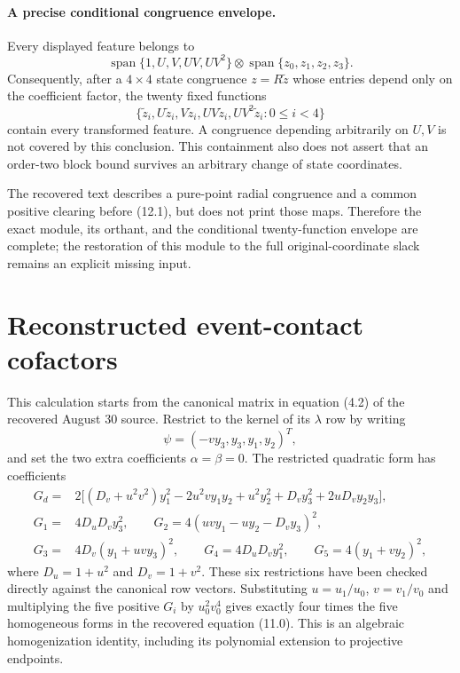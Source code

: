 \paragraph{A precise conditional congruence envelope.}
Every displayed feature belongs to
\[
 \operatorname{span}\{1,U,V,UV,UV^2\}
   \otimes\operatorname{span}\{z_0,z_1,z_2,z_3\}.
\]
Consequently, after a $4\times4$ state congruence
$z=R\widetilde z$ whose entries depend only on the coefficient
factor, the twenty fixed functions
\[
 \{\widetilde z_i,U\widetilde z_i,V\widetilde z_i,
                    UV\widetilde z_i,UV^2\widetilde z_i:0\le i<4\}
\]
contain every transformed feature. A congruence depending arbitrarily
on $U,V$ is not covered by this conclusion. This containment also
does not assert that an order-two block bound survives an arbitrary
change of state coordinates.

The recovered text describes a pure-point radial congruence and a
common positive clearing before (12.1), but does not print those
maps. Therefore the exact module, its orthant, and the conditional
twenty-function envelope are complete; the restoration of this
module to the full original-coordinate slack remains an explicit
missing input.

\section{Reconstructed event-contact cofactors}
\label{sec:event-cofactors}

This calculation starts from the canonical matrix in equation (4.2)
of the recovered August 30 source. Restrict to the kernel of its
$\lambda$ row by writing
\[
 \psi=(-vy_3,y_3,y_1,y_2)^T,
\]
and set the two extra coefficients $\alpha=\beta=0$. The restricted
quadratic form has coefficients
\begin{align}
 G_d={}&2\bigl[(D_v+u^2v^2)y_1^2-2u^2vy_1y_2+u^2y_2^2
                  +D_vy_3^2+2uD_vy_2y_3\bigr],\nonumber\\
 G_1={}&4D_uD_vy_3^2,\qquad
 G_2=4(uvy_1-uy_2-D_vy_3)^2,\nonumber\\
 G_3={}&4D_v(y_1+uvy_3)^2,\qquad
 G_4=4D_uD_vy_1^2,\qquad
 G_5=4(y_1+vy_2)^2,
 \label{eq:event-restriction}
\end{align}
where $D_u=1+u^2$ and $D_v=1+v^2$. These six restrictions have been
checked directly against the canonical row vectors. Substituting
$u=u_1/u_0$, $v=v_1/v_0$ and multiplying the five positive $G_i$ by
$u_0^2v_0^4$ gives exactly four times the five homogeneous forms in
the recovered equation (11.0). This is an algebraic homogenization
identity, including its polynomial extension to projective endpoints.

